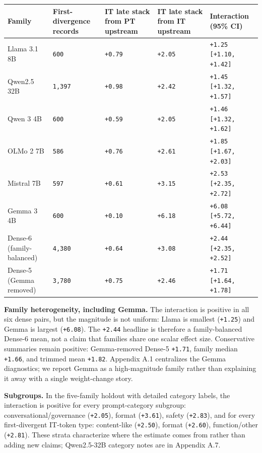 \documentclass[11pt]{article}
\begin{document}
\begin{table}[t]
\centering
\small
\setlength{\tabcolsep}{3pt}
\begin{tabularx}{\linewidth}{@{}>{\raggedright\arraybackslash}X >{\raggedright\arraybackslash}X >{\raggedright\arraybackslash}X >{\raggedright\arraybackslash}X >{\raggedright\arraybackslash}X@{}}
\toprule
Family & First-divergence records & IT late stack from PT upstream & IT late stack from IT upstream & Interaction (95\% CI) \\
\midrule
Llama 3.1 8B & \texttt{600} & \texttt{+0.79} & \texttt{+2.05} & \texttt{+1.25} \texttt{[+1.10, +1.42]} \\
Qwen2.5 32B & \texttt{1,397} & \texttt{+0.98} & \texttt{+2.42} & \texttt{+1.45} \texttt{[+1.32, +1.57]} \\
Qwen 3 4B & \texttt{600} & \texttt{+0.59} & \texttt{+2.05} & \texttt{+1.46} \texttt{[+1.32, +1.62]} \\
OLMo 2 7B & \texttt{586} & \texttt{+0.76} & \texttt{+2.61} & \texttt{+1.85} \texttt{[+1.67, +2.03]} \\
Mistral 7B & \texttt{597} & \texttt{+0.61} & \texttt{+3.15} & \texttt{+2.53} \texttt{[+2.35, +2.72]} \\
Gemma 3 4B & \texttt{600} & \texttt{+0.10} & \texttt{+6.18} & \texttt{+6.08} \texttt{[+5.72, +6.44]} \\
Dense-6 (family-balanced) & \texttt{4,380} & \texttt{+0.64} & \texttt{+3.08} & \texttt{+2.44} \texttt{[+2.35, +2.52]} \\
Dense-5 (Gemma removed) & \texttt{3,780} & \texttt{+0.75} & \texttt{+2.46} & \texttt{+1.71} \texttt{[+1.64, +1.78]} \\
\bottomrule
\end{tabularx}
\end{table}

\textbf{Family heterogeneity, including Gemma.} The interaction is positive in all six dense pairs, but the magnitude is not uniform: Llama is smallest (\texttt{+1.25}) and Gemma is largest (\texttt{+6.08}). The \texttt{+2.44} headline is therefore a family-balanced Dense-6 mean, not a claim that families share one scalar effect size. Conservative summaries remain positive: Gemma-removed Dense-5 \texttt{+1.71}, family median \texttt{+1.66}, and trimmed mean \texttt{+1.82}. Appendix A.1 centralizes the Gemma diagnostics; we report Gemma as a high-magnitude family rather than explaining it away with a single weight-change story.

\textbf{Subgroups.} In the five-family holdout with detailed category labels, the interaction is positive for every prompt-category subgroup: conversational/governance (\texttt{+2.05}), format (\texttt{+3.61}), safety (\texttt{+2.83}), and for every first-divergent IT-token type: content-like (\texttt{+2.50}), format (\texttt{+2.60}), function/other (\texttt{+2.81}). These strata characterize where the estimate comes from rather than adding new claims; Qwen2.5-32B category notes are in Appendix A.7.
\end{document}

